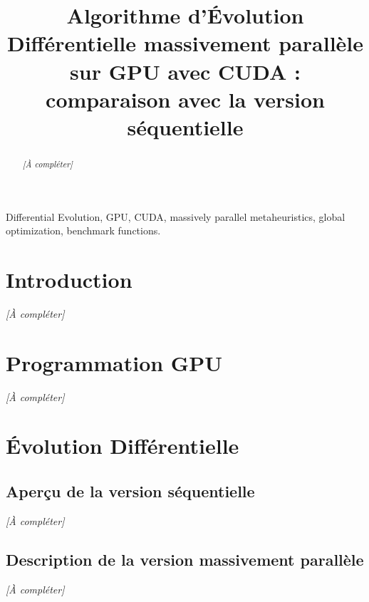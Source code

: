 \documentclass[conference]{IEEEtran}
\begin{document}
\title{Algorithme d'\'Evolution Diff\'erentielle massivement parall\`ele sur GPU avec CUDA : comparaison avec la version s\'equentielle}

\author{
}

\maketitle

\begin{abstract}
\textit{[\`A compl\'eter]}
\end{abstract}

\begin{IEEEkeywords}
Differential Evolution, GPU, CUDA, massively parallel metaheuristics, global optimization, benchmark functions.
\end{IEEEkeywords}

\section{Introduction}
\textit{[\`A compl\'eter]}

\section{Programmation GPU}
\textit{[\`A compl\'eter]}

\section{\'Evolution Diff\'erentielle}
\subsection{Aper\c cu de la version s\'equentielle}
\textit{[\`A compl\'eter]}

\subsection{Description de la version massivement parall\`ele}
\textit{[\`A compl\'eter]}
\end{document}

